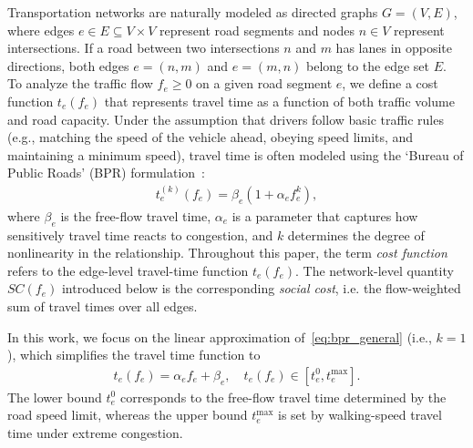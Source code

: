 \documentclass[twocolumn,english,groupedaddress, superscriptaddress,aps,pre,10pt,floatfix]{revtex4-2}
\begin{document}
Transportation networks are naturally modeled as directed graphs $G = (V,E)$, where edges $e \in E \subseteq V \times V$ represent road segments and nodes $n \in V$ represent intersections.
If a road between two intersections $n$ and $m$ has lanes in opposite directions, both edges $e=(n,m)$ and $e=(m,n)$ belong to the edge set $E$.\\



To analyze the traffic flow $f_e \geq 0$ on a given road segment $e$, we define a cost function $t_e(f_e)$ that represents travel time as a function of both traffic volume and road capacity. Under the assumption that drivers follow basic traffic rules (e.g., matching the speed of the vehicle ahead, obeying speed limits, and maintaining a minimum speed), travel time is often modeled using the `Bureau of Public Roads' (BPR) formulation~\cite{us1964traffic}:
\begin{align}
\label{eq:bpr_general}
t_e^{(k)}(f_e) = \beta_e \left(1 + \alpha_e f_e^k \right),
\end{align}
where $\beta_e$ is the free-flow travel time, $\alpha_e$ is a parameter that captures how sensitively travel time reacts to congestion, and $k$ determines the degree of nonlinearity in the relationship. Throughout this paper, the term \emph{cost function} refers to the edge-level travel-time function $t_e(f_e)$. The network-level quantity $SC(f_e)$ introduced below is the corresponding \emph{social cost}, i.e. the flow-weighted sum of travel times over all edges.

In this work, we focus on the linear approximation of~\cref{eq:bpr_general} (i.e., $k = 1$), which simplifies the travel time function to 
\begin{align}\label{eq:linear-travel-time}
t_e(f_e)=\alpha_e f_e+\beta_e,\quad t_e(f_e)\in[t_e^0,t_e^{\mathrm{max}}].
\end{align}
The lower bound $t_e^0$ corresponds to the free-flow travel time determined by the road speed limit, whereas the upper bound $t_e^{\mathrm{max}}$ is set by walking-speed travel time under extreme congestion.
\end{document}
